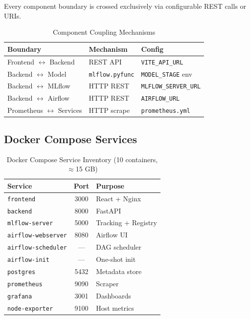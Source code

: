 \documentclass[conference]{IEEEtran}
\begin{document}
Every component boundary is crossed exclusively via configurable REST calls or URIs.

\begin{table}[H]
\centering
\caption{Component Coupling Mechanisms}
\label{tab:coupling}
\begin{tabular}{@{}L{2cm}L{2.5cm}L{2.5cm}@{}}
\toprule
\textbf{Boundary} & \textbf{Mechanism} & \textbf{Config} \\
\midrule
Frontend $\leftrightarrow$ Backend & REST API & \texttt{VITE\_API\_URL} \\
Backend $\leftrightarrow$ Model & \texttt{mlflow.pyfunc} & \texttt{MODEL\_STAGE} env \\
Backend $\leftrightarrow$ MLflow & HTTP REST & \texttt{MLFLOW\_SERVER\_URL} \\
Backend $\leftrightarrow$ Airflow & HTTP REST & \texttt{AIRFLOW\_URL} \\
Prometheus $\leftrightarrow$ Services & HTTP scrape & \texttt{prometheus.yml} \\
\bottomrule
\end{tabular}
\end{table}

\subsection{Docker Compose Services}

\begin{table}[H]
\centering
\caption{Docker Compose Service Inventory (10 containers, $\approx$15 GB)}
\label{tab:docker}
\begin{tabular}{@{}L{2cm}cL{3.5cm}@{}}
\toprule
\textbf{Service} & \textbf{Port} & \textbf{Purpose} \\
\midrule
\texttt{frontend}         & 3000 & React + Nginx \\
\texttt{backend}          & 8000 & FastAPI \\
\texttt{mlflow-server}    & 5000 & Tracking + Registry \\
\texttt{airflow-webserver}& 8080 & Airflow UI \\
\texttt{airflow-scheduler}& —    & DAG scheduler \\
\texttt{airflow-init}     & —    & One-shot init \\
\texttt{postgres}         & 5432 & Metadata store \\
\texttt{prometheus}       & 9090 & Scraper \\
\texttt{grafana}          & 3001 & Dashboards \\
\texttt{node-exporter}    & 9100 & Host metrics \\
\bottomrule
\end{tabular}
\end{table}
\end{document}
